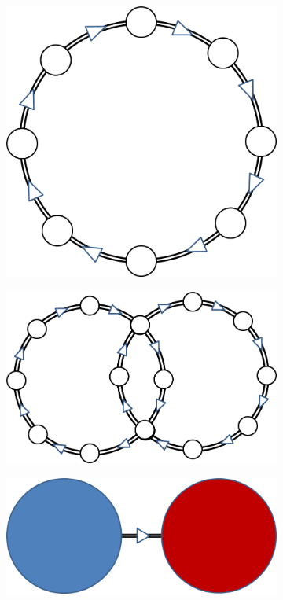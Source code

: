 \begin{figure}
\begin{center}
\begin{subfigure}[b]{0.24\linewidth}
\begin{center}
\includegraphics[width=0.62\linewidth]{../fig/expdesign2.png}\subcaption{}\label{fig:expdesign2}
\end{center}
\end{subfigure}
\begin{subfigure}[b]{0.24\linewidth}
\begin{center}
\includegraphics[width=\linewidth]{../fig/expdesign3.png}\subcaption{}\label{fig:expdesign3}
\end{center}
\end{subfigure}
\begin{subfigure}[b]{0.24\linewidth}
\begin{center}
\includegraphics[width=\linewidth]{../fig/expdesign4.png}\subcaption{}\label{fig:expdesign4}

\end{center}
\end{subfigure}
\end{center}
\end{figure}

